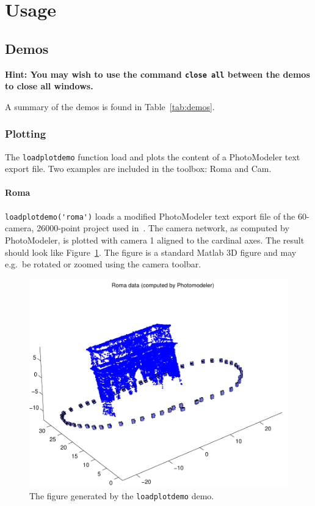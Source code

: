 \documentclass{article}
\begin{document}
\newpage
\section{Usage}

\subsection{Demos}
\label{sec:demos}

\textbf{Hint: You may wish to use the command \texttt{close all}
  between the demos to close all windows.}

A summary of the demos is found in Table~\ref{tab:demos}.

\subsubsection{Plotting}
\label{sec:loadplotdemo}
\label{sec:loadroma}

The \verb+loadplotdemo+ function load and plots the content of a
PhotoModeler text export file. Two examples are included in the
toolbox: {\sc Roma} and {\sc Cam}.

\paragraph{\sc Roma}
\verb+loadplotdemo('roma')+ loads a modified PhotoModeler text export
file of the 60-camera, 26000-point project used
in~\citet{Borlin2013:Bundle}. The camera network, as computed by
PhotoModeler, is plotted with camera 1 aligned to the cardinal axes.
The result should look like Figure~\ref{fig:roma}. The figure is a
standard Matlab 3D figure and may e.g.\ be rotated or zoomed using the
camera toolbar.

\begin{figure}
  \centering
  \includegraphics[width=0.5\hsize]{ill/roma}
  \caption{The figure generated by the \texttt{loadplotdemo} demo.}
  \label{fig:roma}
\end{figure}
\end{document}
